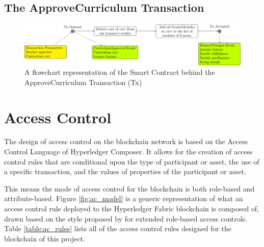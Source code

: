\subsection{The ApproveCurriculum Transaction}

\begin{figure}[!ht]
	\centering
	\includegraphics[width=1.0\textwidth]{actx}
	\caption{A flowchart representation of the Smart Contract behind the ApproveCurriculum Transaction (Tx)} \label{fig:actx}
\end{figure}

\section{Access Control}
The design of access control on the blockchain network is based on the Access Control Language of Hyperledger Composer.
It allows for the creation of access control rules that are conditional upon the type of participant or asset,
the use of a specific transaction, and the values of properties of the participant or asset.

This means the mode of access control for the blockchain is both role-based and attribute-based.
Figure \ref{fig:ac_model} is a generic representation of what an access control rule deployed to the Hyperledger Fabric blockchain is composed of,
drawn based on the style proposed by \citet{poniszewska2005representation} for extended role-based access controls.
Table \ref{table:ac_rules} lists all of the access control rules designed for the blockchain of this project.\\

